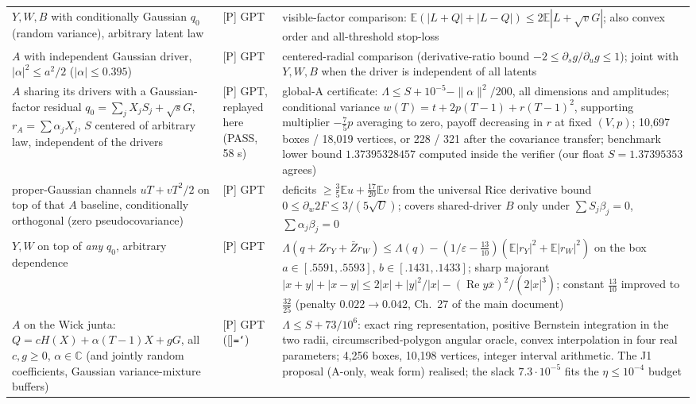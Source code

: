 \documentclass[11pt,a4paper]{article}
\newcommand{\C}{\mathbb{C}}\newcommand{\R}{\mathbb{R}}\newcommand{\E}{\mathbb{E}}\newcommand{\Hc}[2]{H_{#1,#2}}
\renewcommand{\Re}{\operatorname{Re}}\newcommand{\Var}{\operatorname{Var}}\newcommand{\ph}{\operatorname{phase}}\newcommand{\st}[1]{\textsf{[#1]}}\newcommand{\brkus}{\textunderscore\allowbreak}\usepackage{xstring,adjustbox}\DeclareRobustCommand{\code}[1]{\begingroup\noexpandarg\StrSubstitute{#1}{/}{/\allowbreak}[\brktmp]\texttt{\let\_\brkus\hyphenchar\font=`\-\brktmp}\endgroup}\setlength{\emergencystretch}{3em}
\begin{document}
\begin{center}
\begin{tabular}{p{4.6cm}p{2.2cm}p{8.4cm}}
$Y,W,B$ with conditionally Gaussian $q_0$ (random variance), arbitrary latent law & \st{P} GPT & visible-factor comparison: $\E(|L+Q|+|L-Q|)\le2\E|L+\sqrt vG|$; also convex order and all-threshold stop-loss\\
$A$ with independent Gaussian driver, $|\alpha|^2\le a^2/2$ ($|\alpha|\le0.395$) & \st{P} GPT & centered-radial comparison (derivative-ratio bound $-2\le\partial_sg/\partial_ug\le1$); joint with $Y,W,B$ when the driver is independent of all latents\\
$A$ sharing its drivers with a Gaussian-factor residual $q_0=\sum_jX_jS_j+\sqrt sG$, $r_A=\sum\alpha_jX_j$, $S$ centered of arbitrary law, independent of the drivers & \st{P} GPT, replayed here (PASS, 58 s) & global-A certificate: $\Lambda\le S+10^{-5}-\|\alpha\|^2/200$, all dimensions and amplitudes; conditional variance $w(T)=t+2p(T-1)+r(T-1)^2$, supporting multiplier $-\tfrac75p$ averaging to zero, payoff decreasing in $r$ at fixed $(V,p)$; 10,697 boxes / 18,019 vertices, or 228 / 321 after the covariance transfer; benchmark lower bound $1.37395328457$ computed inside the verifier (our float $S=1.37395353$ agrees)\\
proper-Gaussian channels $uT+vT^2/2$ on top of that $A$ baseline, conditionally orthogonal (zero pseudocovariance) & \st{P} GPT & deficits $\ge\tfrac35\E u+\tfrac{17}{20}\E v$ from the universal Rice derivative bound $0\le\partial_w2F\le3/(5\sqrt U)$; covers shared-driver $B$ only under $\sum S_j\beta_j=0$, $\sum\alpha_j\beta_j=0$\\
$Y,W$ on top of \emph{any} $q_0$, arbitrary dependence & \st{P} GPT & $\Lambda(q+Zr_Y+\bar Zr_W)\le\Lambda(q)-(1/\varepsilon-\tfrac{13}{10})(\E|r_Y|^2+\E|r_W|^2)$ on the box $a\in[.5591,.5593]$, $b\in[.1431,.1433]$; sharp majorant $|x+y|+|x-y|\le2|x|+|y|^2/|x|-(\Re y\bar x)^2/(2|x|^3)$; constant $\tfrac{13}{10}$ improved to $\tfrac{32}{25}$ (penalty $0.022\to0.042$, Ch.~27 of the main document)\\
$A$ on the Wick junta: $Q=cH(X)+\alpha(T-1)X+gG$, all $c,g\ge0$, $\alpha\in\C$ (and jointly random coefficients, Gaussian variance-mixture buffers) & \st{P} GPT (\code{junta-and-b-20261015}) & $\Lambda\le S+73/10^6$: exact ring representation, positive Bernstein integration in the two radii, circumscribed-polygon angular oracle, convex interpolation in four real parameters; 4,256 boxes, 10,198 vertices, integer interval arithmetic. The J1 proposal (A-only, weak form) realised; the slack $7.3\cdot10^{-5}$ fits the $\eta\le10^{-4}$ budget\\

\end{tabular}
\end{center}
\end{document}
